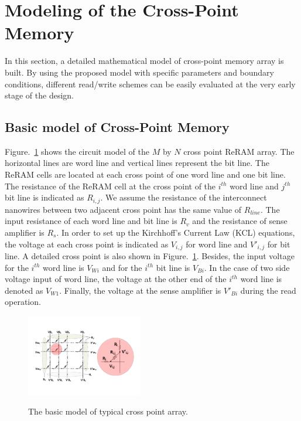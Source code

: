 \vspace{10pt}
\section{Modeling of the Cross-Point Memory}\label{sec:model}

In this section, a detailed mathematical model of cross-point memory array is built. By using the proposed model with specific parameters and
boundary conditions, different read/write schemes can be easily evaluated
at the very early stage of the design.

\subsection{Basic model of Cross-Point Memory}
Figure.~\ref{fig:modeling} shows the circuit model of the $M$ by $N$ cross point ReRAM array. The horizontal lines are word line and vertical lines represent the bit line. The ReRAM cells are located at each cross point of one word line and one bit line. The resistance of the ReRAM cell at the cross point of the $i^{th}$ word line and $j^{th}$ bit line is indicated as $R_{i,j}$. We assume the resistance of the interconnect nanowires between two adjacent cross point has the same value of $R_{line}$. The input resistance of each word line and bit line is $R_v$ and the resistance of sense amplifier is $R_s$. In order to set up the Kirchhoff's Current Law (KCL) equations, the voltage at each cross point is indicated as $V_{i,j}$ for word line and $V'_{i,j}$ for bit line. A detailed cross point is also shown in Figure.~\ref{fig:modeling}. Besides, the input voltage for the $i^{th}$ word line is $V_{Wi}$ and for the $i^{th}$ bit line is $V_{Bi}$. In the case of two side voltage input of word line, the voltage at the other end of the $i^{th}$ word line is denoted as $V_{W1}$. Finally, the voltage at the sense amplifier is $V'_{Bi}$ during the read operation.

\begin{figure}%
\centering
  \includegraphics[width=0.45\textwidth]{./figures/model.pdf}\\
  \caption{The basic model of typical cross point array.}\label{fig:modeling}
\end{figure}
